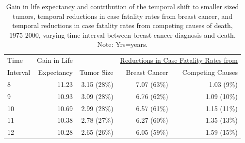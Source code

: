 \documentclass[11pt,letterpaper]{article}
\theoremstyle{plain}
\theoremstyle{remark}
\numberwithin{equation}{section}
\begin{document}
\begin{center}
  \begin{table}[h]
\begin{tabular}{@{}l rrrr@{}}
  Time & Gain in Life & &
                                \multicolumn{2}{c}{\underline{Reductions
                                in Case Fatality Rates from}}\\
  Interval & Expectancy & Tumor Size  & Breast Cancer   & Competing Causes  \\ 
  \midrule
  8  & 11.23 & 3.15 (28\%) & 7.07 (63\%) & 1.03 (9\%) \\ 
  9  & 10.93 & 3.09 (28\%) & 6.76 (62\%) & 1.09 (10\%) \\ 
  10  & 10.69 & 2.99 (28\%) & 6.57 (61\%) & 1.15 (11\%) \\ 
  11  & 10.38 & 2.78 (27\%) & 6.27 (60\%) & 1.35 (13\%) \\ 
  12  & 10.28 & 2.65 (26\%) & 6.05 (59\%) & 1.59 (15\%) \\ 
  \bottomrule
\end{tabular}
\caption{Gain in life expectancy and contribution of the temporal shift to smaller sized tumors, temporal reductions in case fatality rates from breast cancer, and temporal reductions in case fatality rates from
  competing causes of death, 1975-2000, varying time interval between breast
  cancer diagnosis and death.  Note: Yrs=years.}
\end{table}
\end{center}

\newpage
{} 

\end{document}

